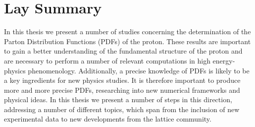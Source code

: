 \chapter*{Lay Summary}
In this thesis we present a number of studies concerning the determination of the
Parton Distribution Functions (PDFs) of the proton. These results are important to gain a better understanding 
of the fundamental structure of the proton and are necessary to perform a number of relevant computations
in high energy-physics phenomenology.
Additionally, a precise knowledge of PDFs is likely to be a key ingredients for new physics studies. 
It is therefore important to produce more and more precise PDFs,
researching into new numerical frameworks and physical ideas. 
In this thesis we present a number of steps in this direction, addressing a number of different topics,
which span from the inclusion of new experimental data to new developments from the lattice community.


